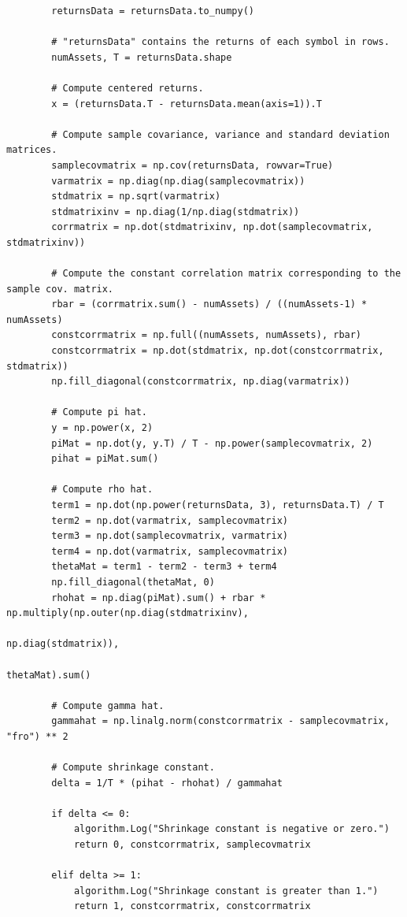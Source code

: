 \begin{verbatim}
        returnsData = returnsData.to_numpy()
        
        # "returnsData" contains the returns of each symbol in rows.
        numAssets, T = returnsData.shape
        
        # Compute centered returns.
        x = (returnsData.T - returnsData.mean(axis=1)).T
        
        # Compute sample covariance, variance and standard deviation matrices.
        samplecovmatrix = np.cov(returnsData, rowvar=True)
        varmatrix = np.diag(np.diag(samplecovmatrix))
        stdmatrix = np.sqrt(varmatrix)
        stdmatrixinv = np.diag(1/np.diag(stdmatrix))
        corrmatrix = np.dot(stdmatrixinv, np.dot(samplecovmatrix, stdmatrixinv))
        
        # Compute the constant correlation matrix corresponding to the sample cov. matrix.
        rbar = (corrmatrix.sum() - numAssets) / ((numAssets-1) * numAssets)
        constcorrmatrix = np.full((numAssets, numAssets), rbar)
        constcorrmatrix = np.dot(stdmatrix, np.dot(constcorrmatrix, stdmatrix))
        np.fill_diagonal(constcorrmatrix, np.diag(varmatrix))
        
        # Compute pi hat.
        y = np.power(x, 2)
        piMat = np.dot(y, y.T) / T - np.power(samplecovmatrix, 2)
        pihat = piMat.sum()
        
        # Compute rho hat.
        term1 = np.dot(np.power(returnsData, 3), returnsData.T) / T
        term2 = np.dot(varmatrix, samplecovmatrix)
        term3 = np.dot(samplecovmatrix, varmatrix)
        term4 = np.dot(varmatrix, samplecovmatrix)
        thetaMat = term1 - term2 - term3 + term4
        np.fill_diagonal(thetaMat, 0)
        rhohat = np.diag(piMat).sum() + rbar * np.multiply(np.outer(np.diag(stdmatrixinv),
                                                                    np.diag(stdmatrix)),
                                                           thetaMat).sum()
        
        # Compute gamma hat.
        gammahat = np.linalg.norm(constcorrmatrix - samplecovmatrix, "fro") ** 2
        
        # Compute shrinkage constant.
        delta = 1/T * (pihat - rhohat) / gammahat
        
        if delta <= 0:
            algorithm.Log("Shrinkage constant is negative or zero.")
            return 0, constcorrmatrix, samplecovmatrix
        
        elif delta >= 1:
            algorithm.Log("Shrinkage constant is greater than 1.")
            return 1, constcorrmatrix, constcorrmatrix
        

\end{verbatim}
